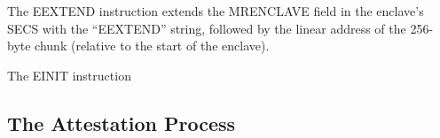 
The EEXTEND instruction extends the MRENCLAVE field in the enclave's SECS with
the ``EEXTEND'' string, followed by the linear address of the 256-byte chunk
(relative to the start of the enclave).

\begin{table}[hbt]
  \caption{
    Data extended into MRENCLAVE by the EEXTEND instruction.
  }
  \label{fig:eadd_mrenclave}
\end{table}


The EINIT instruction

\subsection{The Attestation Process}








